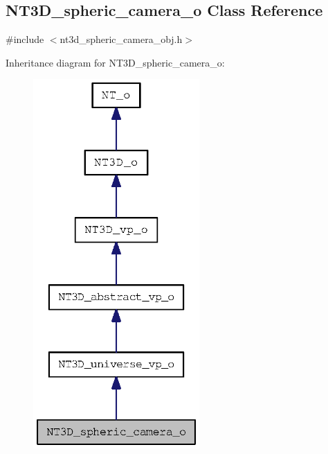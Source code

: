 \subsection{NT3D\_\-spheric\_\-camera\_\-o Class Reference}
\label{class_n_t3_d__spheric__camera__o}


{\ttfamily \#include $<$nt3d\_\-spheric\_\-camera\_\-obj.h$>$}



Inheritance diagram for NT3D\_\-spheric\_\-camera\_\-o:
\nopagebreak
\begin{figure}[H]
\begin{center}
\leavevmode
\includegraphics[width=180pt]{class_n_t3_d__spheric__camera__o__inherit__graph}
\end{center}
\end{figure}


